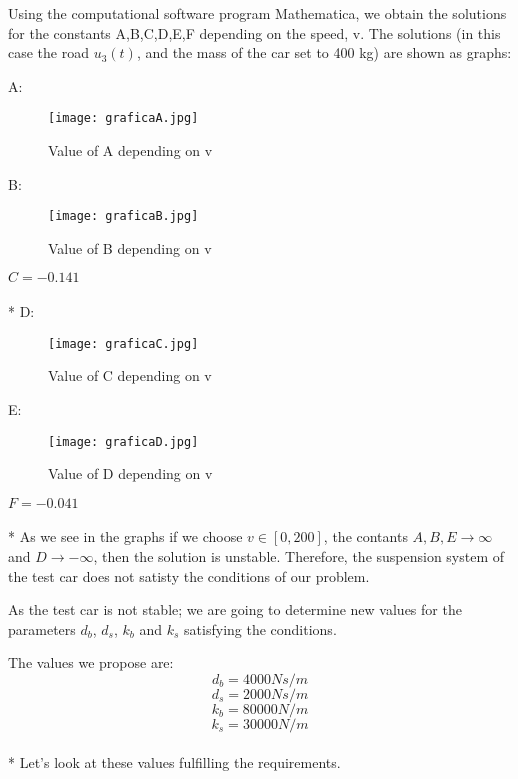 \documentclass[a4paper]{article}
\begin{document}
Using the computational software program Mathematica,
we obtain the solutions for the constants A,B,C,D,E,F depending on the speed, v.
The solutions (in this case the road $u_3(t)$,
and the mass of the car set to 400 kg) are shown as graphs:

A:
\begin{figure}[H]
\centering
\texttt{[image: graficaA.jpg]}
\caption{\label{fig:valOfA}Value of A depending on v}
\end{figure}

\newpage

B:
\begin{figure}[H]
\centering
\texttt{[image: graficaB.jpg]}
\caption{\label{fig:valOfB}Value of B depending on v}
\end{figure}

$C=-0.141$
\\
\\*
D:
\begin{figure}[H]
\centering
\texttt{[image: graficaC.jpg]}
\caption{\label{fig:valOfC}Value of C depending on v}
\end{figure}

\newpage

E:
\begin{figure}[H]
\centering
\texttt{[image: graficaD.jpg]}
\caption{\label{fig:valOfD}Value of D depending on v}
\end{figure}
$F=-0.041$
\\
\\*
As we see in the graphs if we choose $v\in[0,200]$,
the contants $A,B,E\rightarrow \infty$ and $D\rightarrow -\infty$,
then the solution is unstable.
Therefore, the suspension system of the test car does not satisty the conditions of our problem.\\



\newpage



As the test car is not stable;
we are going to determine new values for the parameters $d_b$, $d_s$, $k_b$ and $k_s$ satisfying the conditions.

The values we propose are:
\begin{equation}
	d_b=4000 Ns/m
\end{equation}
\begin{equation}
	d_s=2000 Ns/m
\end{equation}
\begin{equation}
	k_b=80000 N/m
\end{equation}
\begin{equation}
	k_s=30000 N/m
\end{equation}
\\*
Let's look at these values fulfilling the requirements.
\end{document}
